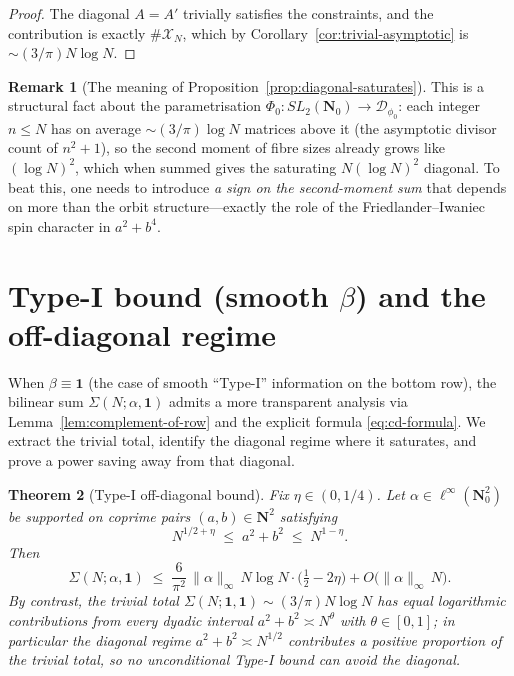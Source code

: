 \documentclass[11pt]{article}
\newtheorem{theorem}{Theorem}[section]
\theoremstyle{definition}
\newtheorem{remark}[theorem]{Remark}
\newcommand{\N}{\mathbf{N}}
\newcommand{\Nz}{\mathbf{N}_0}
\newcommand{\SLNz}{SL_2(\Nz)}
\newcommand{\Dphi}{\mathcal{D}_{\phi_0}}
\begin{document}
\begin{proof}
The diagonal $A=A'$ trivially satisfies the constraints, and the
contribution is exactly $\#\mathcal{X}_{N}$, which by
Corollary~\ref{cor:trivial-asymptotic} is $\sim(3/\pi)N\log N$.
\end{proof}

\begin{remark}[The meaning of Proposition~\ref{prop:diagonal-saturates}]
This is a structural fact about the parametrisation
$\Phi_{0}:\SLNz\to\Dphi$: each integer $n\le N$ has on average
$\sim(3/\pi)\log N$ matrices above it (the asymptotic divisor count of
$n^{2}+1$), so the second moment of fibre sizes already grows like
$(\log N)^{2}$, which when summed gives the saturating $N(\log N)^{2}$
diagonal. To beat this, one needs to introduce \emph{a sign on the
second-moment sum} that depends on more than the orbit
structure---exactly the role of the Friedlander--Iwaniec spin character
in $a^{2}+b^{4}$.
\end{remark}

\section{Type-I bound (smooth $\beta$) and the off-diagonal regime}
\label{sec:type-I}

When $\beta\equiv\mathbf{1}$ (the case of smooth ``Type-I'' information
on the bottom row), the bilinear sum $\Sigma(N;\alpha,\mathbf{1})$
admits a more transparent analysis via Lemma~\ref{lem:complement-of-row}
and the explicit formula \eqref{eq:cd-formula}. We extract the trivial
total, identify the diagonal regime where it saturates, and prove a power
saving away from that diagonal.

\begin{theorem}[Type-I off-diagonal bound]\label{thm:type-I-off-diagonal}
Fix $\eta\in(0,1/4)$. Let $\alpha\in\ell^{\infty}(\Nz^{2})$ be supported
on coprime pairs $(a,b)\in\N^{2}$ satisfying
\begin{equation}\label{eq:off-diagonal-condition}
N^{1/2+\eta}\;\le\;a^{2}+b^{2}\;\le\;N^{1-\eta}.
\end{equation}
Then
\begin{equation}\label{eq:type-I-bound}
\Sigma(N;\alpha,\mathbf{1})\;\le\;
\frac{6}{\pi^{2}}\,\|\alpha\|_{\infty}\,
N\log N\cdot\bigl(\tfrac{1}{2}-2\eta\bigr)+O\bigl(\|\alpha\|_{\infty}\,N\bigr).
\end{equation}
By contrast, the trivial total
$\Sigma(N;\mathbf{1},\mathbf{1})\sim(3/\pi)N\log N$ has equal logarithmic
contributions from \emph{every} dyadic interval $a^{2}+b^{2}\asymp N^{\theta}$
with $\theta\in[0,1]$; in particular the diagonal regime
$a^{2}+b^{2}\asymp N^{1/2}$ contributes a positive proportion of the
trivial total, so no unconditional Type-I bound can avoid the diagonal.
\end{theorem}
\end{document}
